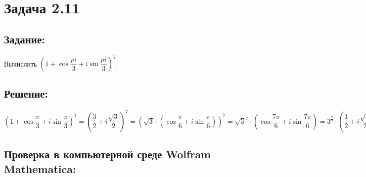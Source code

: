 \section{Задача 2.11}
\subsection{Задание:}
Вычислить $ \left(1 + \cos \dfrac{pi}{3} + i \sin \dfrac{pi}{3}\right)^7 $.
\subsection{Решение:}
$
	\left(1 + \cos \dfrac{\pi}{3} + i \sin \dfrac{\pi}{3}\right)^7 =
	\left(\dfrac{3}{2} + i \dfrac{\sqrt{3}}{2}\right)^7 =
	\left(\sqrt{3} \cdot \left(\cos \dfrac{\pi}{6} + i \sin \dfrac{\pi}{6}\right)\right)^7 =
	\sqrt{3}^7 \cdot \left(\cos \dfrac{7 \pi}{6} + i \sin \dfrac{7 \pi}{6}\right) =
	3^{\frac{7}{2}} \cdot \left(\dfrac{1}{2} + i \dfrac{\sqrt{3}}{2} \right) =
	\dfrac{27 \sqrt{3}}{2} + i \dfrac{81}{2}
$
\subsection{Проверка в компьютерной среде Wolfram Mathematica:}
